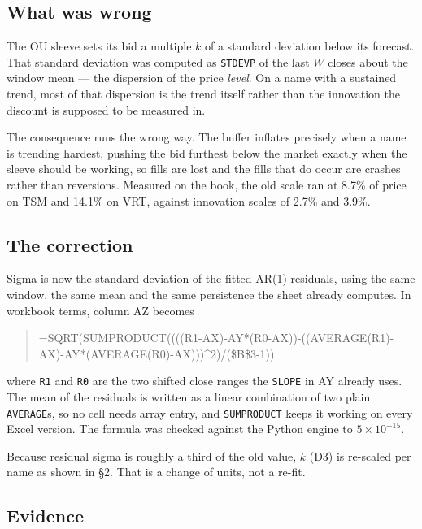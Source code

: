 \documentclass[11pt]{article}
\begin{document}
\subsection{What was wrong}

The OU sleeve sets its bid a multiple $k$ of a standard deviation below its forecast. That
standard deviation was computed as \texttt{STDEVP} of the last $W$ closes about the window mean
--- the dispersion of the price \emph{level}. On a name with a sustained trend, most of that
dispersion is the trend itself rather than the innovation the discount is supposed to be measured
in.

The consequence runs the wrong way. The buffer inflates precisely when a name is trending
hardest, pushing the bid furthest below the market exactly when the sleeve should be working, so
fills are lost and the fills that do occur are crashes rather than reversions. Measured on the
book, the old scale ran at 8.7\% of price on TSM and 14.1\% on VRT, against innovation scales of
2.7\% and 3.9\%.

\subsection{The correction}

Sigma is now the standard deviation of the fitted AR(1) residuals, using the same window, the
same mean and the same persistence the sheet already computes. In workbook terms, column AZ
becomes
\begin{quote}\footnotesize\ttfamily
=SQRT(SUMPRODUCT((((R1-AX)-AY*(R0-AX))-((AVERAGE(R1)-AX)-AY*(AVERAGE(R0)-AX)))\^{}2)/(\$B\$3-1))
\end{quote}
where \texttt{R1} and \texttt{R0} are the two shifted close ranges the \texttt{SLOPE} in AY
already uses. The mean of the residuals is written as a linear combination of two plain
\texttt{AVERAGE}s, so no cell needs array entry, and \texttt{SUMPRODUCT} keeps it working on every
Excel version. The formula was checked against the Python engine to $5\times10^{-15}$.

Because residual sigma is roughly a third of the old value, $k$ (D3) is re-scaled per name as
shown in \S2. That is a change of units, not a re-fit.

\subsection{Evidence}
\end{document}
